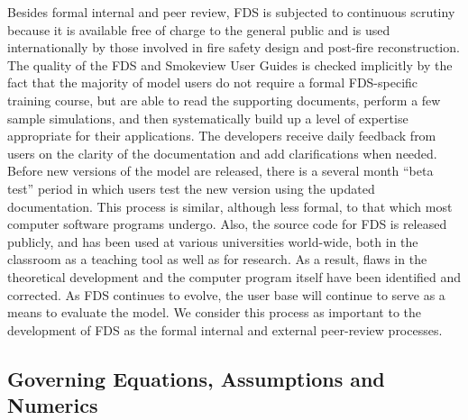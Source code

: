 \documentclass[11pt]{book}
\begin{document}
Besides formal internal and peer review, FDS is subjected to continuous scrutiny because it is available free of charge to the general public and is used internationally by those involved in fire safety design and post-fire reconstruction. The quality of the FDS and Smokeview User Guides is checked implicitly by the fact that the majority of model users do not require a formal FDS-specific training course, but are able to read the supporting documents, perform a few sample simulations, and then systematically build up a level of expertise appropriate for their applications. The developers receive daily feedback from users on the clarity of the documentation and add clarifications when needed. Before new versions of the model are released, there is a several month ``beta test'' period in which users test the new version using the updated documentation. This process is similar, although less formal, to that which most computer software programs undergo. Also, the source code for FDS is released publicly, and has been used at various universities world-wide, both in the classroom as a teaching tool as well as for research. As a result, flaws in the theoretical development and the computer program itself have been identified and corrected. As FDS continues to evolve, the user base will continue to serve as a means to evaluate the model. We consider this process as important to the development of FDS as the formal internal and external peer-review processes.


\subsection{Governing Equations, Assumptions and Numerics}
\end{document}
